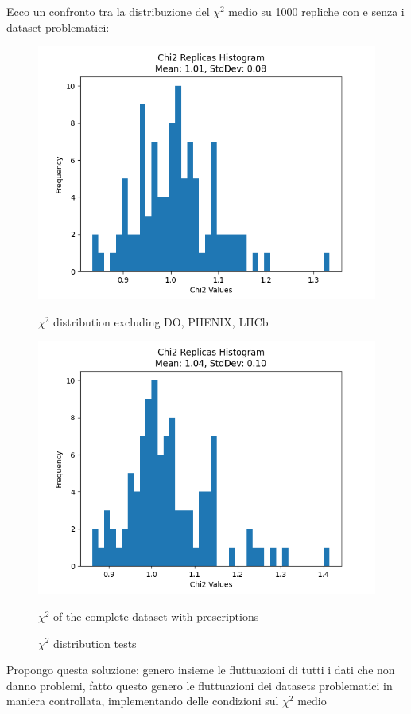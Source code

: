 \documentclass{article}
\begin{document}
\begin{itemize}
    Ecco un confronto tra la distribuzione del $\chi^2$ medio su 1000 repliche con e senza i dataset problematici:
    \begin{figure}[H]
    \centering
    \begin{minipage}{0.45\textwidth}
        \centering
        \includegraphics[width=\textwidth]{Images/Subset_X^2_distribution.png}
        \caption{$\chi^2$ distribution excluding DO, PHENIX, LHCb}
    \end{minipage}\hfill
    \begin{minipage}{0.45\textwidth}
        \centering
        \includegraphics[width=\textwidth]{Images/X^2_distribution_2.png}
        \caption{$\chi^2$ of the complete dataset with prescriptions}
    \end{minipage}
    \caption{$\chi^2$ distribution tests}
    \end{figure}

    Propongo questa soluzione: genero insieme le fluttuazioni di tutti i dati che non danno problemi, fatto questo genero le fluttuazioni dei datasets problematici in maniera controllata, implementando delle condizioni sul $\chi^2$ medio
\end{itemize}
\end{document}
